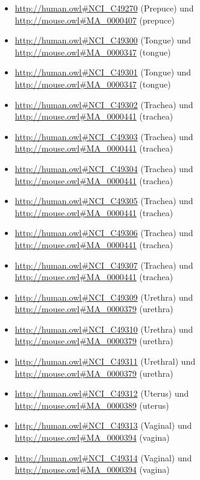 \begin{itemize}
	\item \url{http://human.owl#NCI_C49270} (Prepuce\textunderscoreEpithelium) und \url{http://mouse.owl#MA_0000407} (prepuce)
	\item \url{http://human.owl#NCI_C49300} (Tongue\textunderscoreEpithelium) und \url{http://mouse.owl#MA_0000347} (tongue)
	\item \url{http://human.owl#NCI_C49301} (Tongue\textunderscoreSkeletal\textunderscoreMuscle\textunderscoreTissue) und \url{http://mouse.owl#MA_0000347} (tongue)
	\item \url{http://human.owl#NCI_C49302} (Trachea\textunderscoreBasement\textunderscoreMembrane) und \url{http://mouse.owl#MA_0000441} (trachea)
	\item \url{http://human.owl#NCI_C49303} (Trachea\textunderscoreBasal\textunderscoreLamina) und \url{http://mouse.owl#MA_0000441} (trachea)
	\item \url{http://human.owl#NCI_C49304} (Trachea\textunderscoreCartilage) und \url{http://mouse.owl#MA_0000441} (trachea)
	\item \url{http://human.owl#NCI_C49305} (Trachea\textunderscoreLamina\textunderscorePropria) und \url{http://mouse.owl#MA_0000441} (trachea)
	\item \url{http://human.owl#NCI_C49306} (Trachea\textunderscoreSmooth\textunderscoreMuscle\textunderscoreTissue) und \url{http://mouse.owl#MA_0000441} (trachea)
	\item \url{http://human.owl#NCI_C49307} (Trachea\textunderscoreSubmucosa) und \url{http://mouse.owl#MA_0000441} (trachea)
	\item \url{http://human.owl#NCI_C49309} (Urethra\textunderscoreEpithelium) und \url{http://mouse.owl#MA_0000379} (urethra)
	\item \url{http://human.owl#NCI_C49310} (Urethra\textunderscoreTransitional\textunderscoreCell\textunderscoreEpithelium) und \url{http://mouse.owl#MA_0000379} (urethra)
	\item \url{http://human.owl#NCI_C49311} (Urethral\textunderscoreGlund) und \url{http://mouse.owl#MA_0000379} (urethra)
	\item \url{http://human.owl#NCI_C49312} (Uterus\textunderscoreSerosal\textunderscoreSurface) und \url{http://mouse.owl#MA_0000389} (uterus)
	\item \url{http://human.owl#NCI_C49313} (Vaginal\textunderscoreEpithelium) und \url{http://mouse.owl#MA_0000394} (vagina)
	\item \url{http://human.owl#NCI_C49314} (Vaginal\textunderscoreSquamous\textunderscoreEpithelium) und \url{http://mouse.owl#MA_0000394} (vagina)

\end{itemize}
